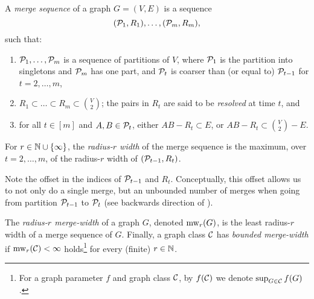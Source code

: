       


\begin{definition}\label{def:ms}
A \emph{merge sequence} of a graph $G=(V,E)$ 
is a sequence
$$(\cal P_1,R_1),\ldots,(\cal P_m,R_m),$$
  such that:
  \begin{enumerate}
    \item $\cal P_1,\ldots,\cal P_m$ is a sequence of partitions of $V$, 
    where $\cal P_1$ is the partition into singletons and $\cal P_m$ has one part,
    and $\cal P_{t}$ is coarser than (or equal to) $\cal P_{t-1}$ for $t=2,\ldots,m$,
    \item $R_1\subset\ldots\subset R_m\subset {V\choose 2}$; the pairs in $R_t$ are said to be \emph{resolved} at time $t$, and
    \item for all $t\in [m]$ and $A,B\in \cal P_t$,
     either $AB-R_t\subset E$, or $AB-R_t\subset {V\choose 2} - E$.
  \end{enumerate}
For $r\in\N\cup\set{\infty}$, the \emph{radius-$r$ width} of the merge sequence is the maximum, over $t=2,\ldots,m$,
of the radius-$r$ width of $(\cal P_{t-1},R_t)$.
\end{definition}

Note the offset in the indices of $\cal P_{t-1}$ and $R_t$.
Conceptually, this offset allows us to not only do a single merge, but an unbounded number of merges when going from partition \(\cal P_{t-1}\) to \(\cal P_t\) (see backwards direction of ).

\begin{definition}
  The \emph{radius-$r$ merge-width} of a graph $G$, denoted $\mw_r(G)$, is the least radius-$r$ width of a merge sequence of $G$.
Finally, a graph class $\CC$ has \emph{bounded merge-width}
  if ${\mw_r(\CC)<\infty}$ holds\footnote{For a graph parameter $f$ and graph class $\CC$, by $f(\CC)$ we denote $\sup_{G\in\CC}f(G)$.} for every (finite) $r\in\N$.
\end{definition}

